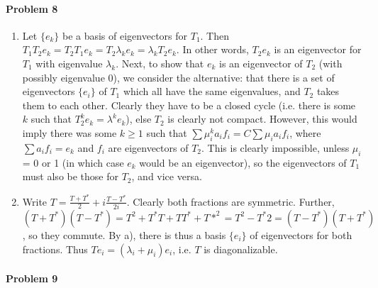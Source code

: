 \documentclass[12pt]{article}
\begin{document}
\paragraph{Problem 8}
\begin{enumerate}[label=\alph*)]
\item Let $\{e_k\}$ be a basis of eigenvectors for $T_1$. Then $T_1T_2e_k =
  T_2T_1e_k = T_2\lambda_ke_k = \lambda_kT_2e_k$. In other words, $T_2e_k$ is
  an eigenvector for $T_1$ with eigenvalue $\lambda_k$. Next, to show that
  $e_k$ is an eigenvector of $T_2$ (with possibly eigenvalue 0), we consider
  the alternative: that there is a set of eigenvectors $\{e_i\}$ of $T_1$ which
  all have the same eigenvalues, and $T_2$ takes them to each other. Clearly
  they have to be a closed cycle (i.e. there is some $k$ such that $T_2^ke_k =
  \lambda^ke_k$), else $T_2$ is clearly not compact. However, this would imply
  there was some $k\geq 1$ such that $\sum\mu_i^ka_if_i = C\sum\mu_ia_if_i$,
  where $\sum a_if_i = e_k$ and $f_i$ are eigenvectors of $T_2$. This is
  clearly impossible, unless $\mu_i$ = 0 or 1 (in which case $e_k$ would be an
  eigenvector), so the eigenvectors of $T_1$ must also be those for
  $T_2$, and vice versa.
\item Write $T = \frac{T+T^*}{2} + i\frac{T-T^*}{2i}$. Clearly both fractions
  are symmetric. Further, $(T+T^*)(T-T^*)= T^2 + T^*T+TT^*+T*^2 = T^2-T^*2
  = (T-T^*)(T+T^*)$, so they commute. By a), there is thus a basis $\{e_i\}$ of
  eigenvectors for both fractions. Thus $Te_i = (\lambda_i + \mu_i)e_i$, i.e.
  $T$ is diagonalizable.
\end{enumerate}

\paragraph{Problem 9}
\end{document}
